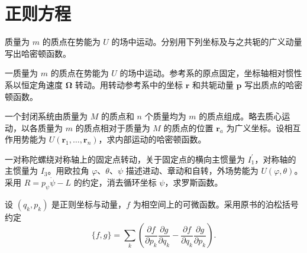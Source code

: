 \renewcommand{\thesection}{\arabic{section}}\renewcommand{\theHsection}{chapter.\arabic{section}}\setcounter{section}{6}\section{正则方程}
\noindent\begin{minipage}{\textwidth}
质量为 $m$ 的质点在势能为 $U$ 的场中运动。分别用下列坐标及与之共轭的广义动量写出哈密顿函数。
\end{minipage}\par\vfill
\noindent\begin{minipage}{\textwidth}
一质量为 $m$ 的质点在势能为 $U$ 的场中运动。参考系的原点固定，坐标轴相对惯性系以恒定角速度 $\boldsymbol{\Omega}$ 转动。用转动参考系中的坐标 $\mathbf r$ 和共轭动量 $\mathbf p$ 写出质点的哈密顿函数。
\end{minipage}\par\vfill
\newpage
\noindent\begin{minipage}{\textwidth}
一个封闭系统由质量为 $M$ 的质点和 $n$ 个质量均为 $m$ 的质点组成。略去质心运动，以各质量为 $m$ 的质点相对于质量为 $M$ 的质点的位置 $\mathbf r_a$ 为广义坐标。设相互作用势能为 $U(\mathbf r_1,\dots,\mathbf r_n)$，求内部运动的哈密顿函数。
\end{minipage}\par\vfill
\noindent\begin{minipage}{\textwidth}
一对称陀螺绕对称轴上的固定点转动，关于固定点的横向主惯量为 $I_1^\prime$，对称轴的主惯量为 $I_3$。用欧拉角 $\varphi$、$\theta$、$\psi$ 描述进动、章动和自转，外场势能为 $U(\varphi,\theta)$。采用 $R=p_\psi\dot\psi-L$ 的约定，消去循环坐标 $\psi$，求罗斯函数。
\end{minipage}\par\vfill
\newpage
\noindent\begin{minipage}{\textwidth}
设 $(q_k,p_k)$ 是正则坐标与动量，$f$ 为相空间上的可微函数。采用原书的泊松括号约定
\[
\{f,g\}=\sum_k\left(\frac{\partial f}{\partial p_k}\frac{\partial g}{\partial q_k}
-\frac{\partial f}{\partial q_k}\frac{\partial g}{\partial p_k}\right).
\]
\end{minipage}\par\vfill
